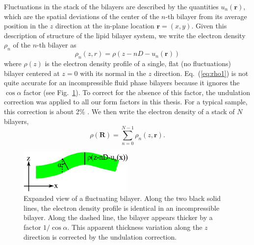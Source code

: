 Fluctuations in the stack of the bilayers are described by the
quantities $u_{n}\left(\mathbf{r}\right)$, which are the spatial
deviations of the center of the $n$-th bilayer 
from its average position in the $z$ direction
at the in-plane location $\mathbf{r}=(x,y)$.
Given this description of structure of the lipid bilayer system, we
write the electron density $\rho _{n}$ of the $n$-th bilayer as 
\begin{equation}
  \rho_n(z,r) = \rho(z-nD-u_{n}(\mathbf{r}))
  \label{eq:rho1}
\end{equation}
where $\rho(z)$ is the electron density profile of a single, flat 
(no fluctuations) bilayer centered at $z=0$ with its normal in the 
$z$ direction. Eq.~(\ref{eq:rho1}) is not quite accurate for an incompressible
fluid phase bilayers because it ignores the $\cos\alpha$ factor \cite{Liu03} 
(see Fig.~\ref{fig:stack2}). To correct for the absence of this factor, 
the undulation correction \cite{Nagle00} was applied to all our 
form factors in this thesis. For a typical sample, this correction is about 
2\% \cite{Liu03}. We then write the electron density of a stack of $N$ bilayers,
\begin{equation}
  \rho \left(\mathbf{R}\right)=\sum _{n=0}^{N-1}\rho _{n}\left(z,\mathbf{r}\right).
  \label{eq:rho3}
\end{equation}

\begin{figure}[htbp]
  \centering
  \includegraphics[width=0.5\textwidth]{figures/Tat/stack2}
  \caption{Expanded view of a fluctuating bilayer. Along the two black solid
  lines, the electron density profile is identical in an incompressible 
  bilayer. Along the dashed line, the bilayer appears thicker by a factor
  $1/\cos\alpha$. This apparent thickness variation along the $z$ direction 
  is corrected by the undulation correction.}
  \label{fig:stack2}
\end{figure}

